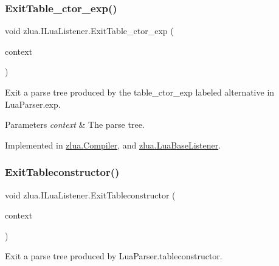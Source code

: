 \subsubsection{\texorpdfstring{Exit\+Table\+\_\+ctor\+\_\+exp()}{ExitTable\_ctor\_exp()}}
{\footnotesize\ttfamily void zlua.\+I\+Lua\+Listener.\+Exit\+Table\+\_\+ctor\+\_\+exp (\begin{DoxyParamCaption}\item[{\mbox{[}\+Not\+Null\mbox{]} \mbox{\hyperlink{classzlua_1_1_lua_parser_1_1_table__ctor__exp_context}{Lua\+Parser.\+Table\+\_\+ctor\+\_\+exp\+Context}}}]{context }\end{DoxyParamCaption})}



Exit a parse tree produced by the {\ttfamily table\+\_\+ctor\+\_\+exp} labeled alternative in Lua\+Parser.\+exp. 


\begin{DoxyParams}{Parameters}
{\em context} & The parse tree.\\
\hline
\end{DoxyParams}


Implemented in \mbox{\hyperlink{classzlua_1_1_compiler_a5bcebfe8e9a0771dff337a0db7cd6e25}{zlua.\+Compiler}}, and \mbox{\hyperlink{classzlua_1_1_lua_base_listener_ac8f2cae2546480b3e82b85cd55a7258e}{zlua.\+Lua\+Base\+Listener}}.

\mbox{\label{interfacezlua_1_1_i_lua_listener_ae19198d7c5130d70ca8ffa5ff81c168e}} 
\subsubsection{\texorpdfstring{Exit\+Tableconstructor()}{ExitTableconstructor()}}
{\footnotesize\ttfamily void zlua.\+I\+Lua\+Listener.\+Exit\+Tableconstructor (\begin{DoxyParamCaption}\item[{\mbox{[}\+Not\+Null\mbox{]} \mbox{\hyperlink{classzlua_1_1_lua_parser_1_1_tableconstructor_context}{Lua\+Parser.\+Tableconstructor\+Context}}}]{context }\end{DoxyParamCaption})}



Exit a parse tree produced by Lua\+Parser.\+tableconstructor. 


